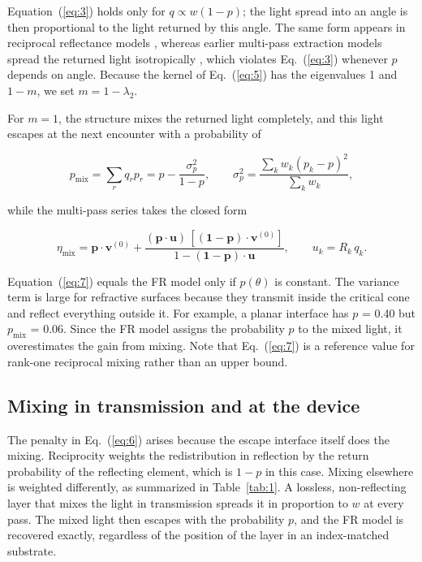 \documentclass{optica-article}
\begin{document}
Equation~(\ref{eq:3}) holds only for $q \propto w(1-p)$; the light spread into an angle is then proportional to the light returned by this angle. The same form appears in reciprocal reflectance models \cite{r25}, whereas earlier multi-pass extraction models spread the returned light isotropically \cite{r11,r15}, which violates Eq.~(\ref{eq:3}) whenever $p$ depends on angle. Because the kernel of Eq.~(\ref{eq:5}) has the eigenvalues 1 and $1-m$, we set $m = 1-\lambda_2$.

For $m = 1$, the structure mixes the returned light completely, and this light escapes at the next encounter with a probability of

\begin{equation}
\label{eq:6}
p_{\mathrm{mix}} = \sum_r q_r p_r = p - \frac{\sigma_p^2}{1-p}, \qquad \sigma_p^2 = \frac{\sum_k w_k (p_k - p)^2}{\sum_k w_k},
\end{equation}

while the multi-pass series takes the closed form

\begin{equation}
\label{eq:7}
\eta_{\mathrm{mix}} = \mathbf{p}\cdot\mathbf{v}^{(0)} + \frac{(\mathbf{p}\cdot\mathbf{u})\,[(\mathbf{1}-\mathbf{p})\cdot\mathbf{v}^{(0)}]}{1-(\mathbf{1}-\mathbf{p})\cdot\mathbf{u}}, \qquad u_k = R_k\,q_k .
\end{equation}

Equation~(\ref{eq:7}) equals the FR model only if $p(\theta)$ is constant. The variance term is large for refractive surfaces because they transmit inside the critical cone and reflect everything outside it. For example, a planar interface has $p$ = 0.40 but $p_{\mathrm{mix}}$ = 0.06. Since the FR model assigns the probability $p$ to the mixed light, it overestimates the gain from mixing. Note that Eq.~(\ref{eq:7}) is a reference value for rank-one reciprocal mixing rather than an upper bound.

\subsection{Mixing in transmission and at the device}

The penalty in Eq.~(\ref{eq:6}) arises because the escape interface itself does the mixing. Reciprocity weights the redistribution in reflection by the return probability of the reflecting element, which is $1-p$ in this case. Mixing elsewhere is weighted differently, as summarized in Table~\ref{tab:1}. A lossless, non-reflecting layer that mixes the light in transmission spreads it in proportion to $w$ at every pass. The mixed light then escapes with the probability $p$, and the FR model is recovered exactly, regardless of the position of the layer in an index-matched substrate.
\end{document}
